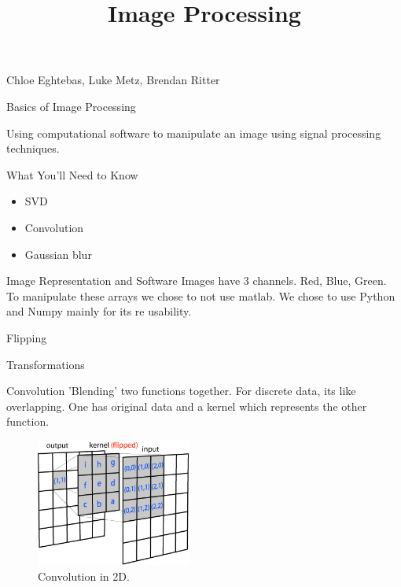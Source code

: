 \documentclass{beamer}
\begin{document}
\begin{frame}{}

\title{\textbf{Image Processing}}
\maketitle

Chloe Eghtebas, Luke Metz, Brendan Ritter

\end{frame}


\begin{frame}{Basics of Image Processing}

Using computational software to manipulate an image using signal processing techniques.

\end{frame}



\begin{frame}{What You'll Need to Know}

\begin{itemize}
	\item SVD
	\item Convolution
	\item Gaussian blur
\end{itemize}
\end{frame}

\begin{frame}{Image Representation and Software}
Images have 3 channels. Red, Blue, Green. To manipulate these arrays we chose to not use matlab. We chose to use Python and Numpy mainly for its re usability.
\end{frame} 


\begin{frame}{Flipping}

\end{frame}


\begin{frame}{Transformations}

\end{frame}

\begin{frame}{Convolution}
'Blending' two functions together. For discrete data, its like overlapping.
One has original data and a kernel which represents the other function. 
\begin{figure}[htp]
\centering
\includegraphics[width=2in]{conv2d_matrix.jpg}
\caption{Convolution in 2D.}
\label{}
\end{figure}
\end{frame}
\end{document}
